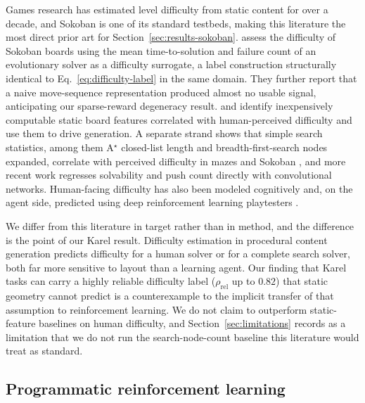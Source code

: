 \documentclass[twoside]{article}
\begin{document}
Games research has estimated level difficulty from static content for over a decade, and Sokoban is one of its standard testbeds, making this literature the most direct prior art for Section~\ref{sec:results-sokoban}. \citet{ashlock2010evolution} assess the difficulty of Sokoban boards using the mean time-to-solution and failure count of an evolutionary solver as a difficulty surrogate, a label construction structurally identical to Eq.~\ref{eq:difficulty-label} in the same domain. They further report that a naive move-sequence representation produced almost no usable signal, anticipating our sparse-reward degeneracy result. \citet{kartal2016data} and \citet{vankreveld2015automated} identify inexpensively computable static board features correlated with human-perceived difficulty and use them to drive generation. A separate strand shows that simple search statistics, among them A$^\star$ closed-list length and breadth-first-search nodes expanded, correlate with perceived difficulty in mazes and Sokoban \citep{vankreveld2015automated}, and more recent work regresses solvability and push count directly with convolutional networks. Human-facing difficulty has also been modeled cognitively \citep{jarusek2010difficulty} and, on the agent side, predicted using deep reinforcement learning playtesters \citep{roohi2021predicting}.

We differ from this literature in target rather than in method, and the difference is the point of our Karel result. Difficulty estimation in procedural content generation predicts difficulty for a human solver or for a complete search solver, both far more sensitive to layout than a learning agent. Our finding that Karel tasks can carry a highly reliable difficulty label ($\rho_{\mathrm{rel}}$ up to $0.82$) that static geometry cannot predict is a counterexample to the implicit transfer of that assumption to reinforcement learning. We do not claim to outperform static-feature baselines on human difficulty, and Section~\ref{sec:limitations} records as a limitation that we do not run the search-node-count baseline this literature would treat as standard.

\subsection{Programmatic reinforcement learning}
\end{document}
